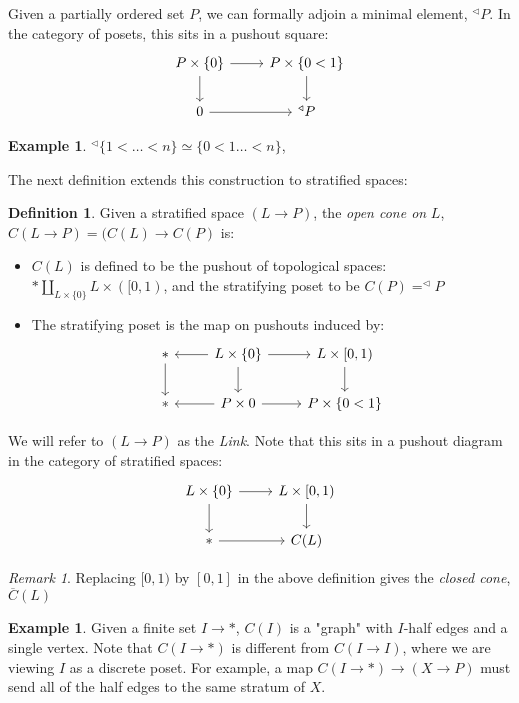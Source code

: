 \documentclass[11pt,reqno]{amsart}
\theoremstyle{plain}
\numberwithin{equation}{section}
\theoremstyle{remark}
\newtheorem{rek}[thm]{Remark}
\theoremstyle{definition}
\newtheorem{defi}[thm]{Definition}
\newtheorem{ex}[thm]{Example}
\begin{document}
Given a partially ordered set $P$, we can formally adjoin a minimal element, $^\triangleleft P$. In the category of posets, this sits in a pushout square:
$$
\begin{tikzcd}
P \times \{0\} \arrow[r] \arrow[d] & P \times \{0<1\} \arrow[d] \\
{0} \arrow[r]                      & ^\triangleleft P          
\end{tikzcd}
$$
\begin{ex}
 $^\triangleleft \{ 1<\dots <n\} \simeq \{0 < 1 \dots < n\}$,
\end{ex}
The next definition extends this construction to stratified spaces:
\begin{defi}
Given a stratified space $(L \rightarrow P)$, the \textit{open cone on} $L$, $C(L\rightarrow P ) = (C(L) \rightarrow C(P)$ is:
\begin{itemize}
\item $C(L)$ is defined to be the pushout of topological spaces: $ * \amalg_{L \times \{0\}} L\times ([0, 1)$, and the stratifying poset to be $C(P) = ^\triangleleft P$
\item The stratifying poset is the map on pushouts induced by:
$$
\begin{tikzcd}
* \arrow[d] & L\times \{0\} \arrow[d] \arrow[l] \arrow[r] & {L \times [0, 1)} \arrow[d] \\
*           & P\times 0 \arrow[l] \arrow[r]               & P \times \{0 < 1\}         
\end{tikzcd}
$$
\end{itemize}
We will refer to $(L\rightarrow P)$ as the \textit{Link}. Note that this sits in a pushout diagram in the category of stratified spaces:
$$
\begin{tikzcd}
L\times \{0\} \arrow[r] \arrow[d] & {L\times [0, 1)} \arrow[d] \\
* \arrow[r]                       & C(L)                      
\end{tikzcd}
$$
\end{defi}

\begin{rek}
Replacing $[0 , 1)$ by $[0, 1]$ in the above definition gives the \textit{closed cone}, $\overline{C}(L)$
\end{rek}

\begin{ex}
Given a finite set $I\rightarrow *$, $C(I)$ is a "graph" with $I$-half edges and a single vertex. Note that $C(I \rightarrow *)$ is different from $C(I \rightarrow I)$, where we are viewing $I$ as a discrete poset. For example, a map $C(I \rightarrow *) \rightarrow (X\rightarrow P)$ must send all of the half edges to the same stratum of $X$.
\end{ex}
\end{document}
